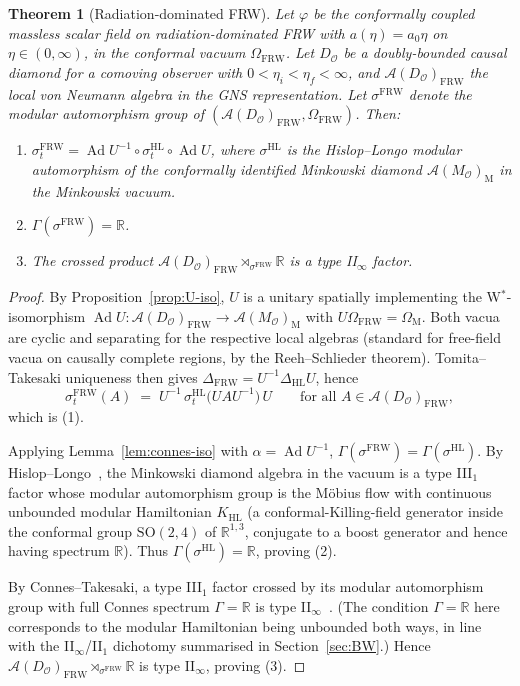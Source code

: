 \documentclass[11pt]{article}
\newtheorem{theorem}{Theorem}
\theoremstyle{definition}
\newcommand{\R}{\mathbb{R}}
\renewcommand{\AA}{\mathcal{A}}
\newcommand{\OO}{\mathcal{O}}
\newcommand{\Ad}{\operatorname{Ad}}
\newcommand{\HL}{\mathrm{HL}}
\newcommand{\FRW}{\mathrm{FRW}}
\newcommand{\Mink}{\mathrm{M}}
\begin{document}
\begin{theorem}[Radiation-dominated FRW]\label{thm:main}
Let $\varphi$ be the conformally coupled massless scalar field on radiation-dominated FRW with $a(\eta)=a_0\eta$ on $\eta\in(0,\infty)$, in the conformal vacuum $\Omega_\FRW$. Let $D_\OO$ be a doubly-bounded causal diamond for a comoving observer with $0<\eta_i<\eta_f<\infty$, and $\AA(D_\OO)_\FRW$ the local von Neumann algebra in the GNS representation. Let $\sigma^\FRW$ denote the modular automorphism group of $(\AA(D_\OO)_\FRW,\Omega_\FRW)$. Then:
\begin{enumerate}
\item $\sigma_t^\FRW = \Ad U^{-1} \circ \sigma_t^\HL \circ \Ad U$, where $\sigma^\HL$ is the Hislop--Longo modular automorphism of the conformally identified Minkowski diamond $\AA(M_\OO)_\Mink$ in the Minkowski vacuum.
\item $\Gamma(\sigma^\FRW) = \R$.
\item The crossed product $\AA(D_\OO)_\FRW \rtimes_{\sigma^\FRW} \R$ is a type II$_\infty$ factor.
\end{enumerate}
\end{theorem}

\begin{proof}
By Proposition~\ref{prop:U-iso}, $U$ is a unitary spatially implementing the W$^*$-isomorphism $\Ad U : \AA(D_\OO)_\FRW \to \AA(M_\OO)_\Mink$ with $U\Omega_\FRW=\Omega_\Mink$. Both vacua are cyclic and separating for the respective local algebras (standard for free-field vacua on causally complete regions, by the Reeh--Schlieder theorem). Tomita--Takesaki uniqueness then gives $\Delta_\FRW = U^{-1}\Delta_\HL U$, hence
\[
\sigma_t^\FRW(A) \;=\; U^{-1}\,\sigma_t^\HL\big(U A U^{-1}\big)\,U \qquad \text{for all }A\in\AA(D_\OO)_\FRW,
\]
which is (1).

Applying Lemma~\ref{lem:connes-iso} with $\alpha = \Ad U^{-1}$, $\Gamma(\sigma^\FRW) = \Gamma(\sigma^\HL)$. By Hislop--Longo~\cite{HislopLongo1982}, the Minkowski diamond algebra in the vacuum is a type III$_1$ factor whose modular automorphism group is the M\"obius flow with continuous unbounded modular Hamiltonian $K_\HL$ (a conformal-Killing-field generator inside the conformal group $\mathrm{SO}(2,4)$ of $\R^{1,3}$, conjugate to a boost generator and hence having spectrum $\R$). Thus $\Gamma(\sigma^\HL)=\R$, proving (2).

By Connes--Takesaki, a type III$_1$ factor crossed by its modular automorphism group with full Connes spectrum $\Gamma=\R$ is type II$_\infty$~\cite[\S2]{CLPW2023, Witten2022}. (The condition $\Gamma=\R$ here corresponds to the modular Hamiltonian being unbounded both ways, in line with the II$_\infty$/II$_1$ dichotomy summarised in Section~\ref{sec:BW}.) Hence $\AA(D_\OO)_\FRW \rtimes_{\sigma^\FRW}\R$ is type II$_\infty$, proving (3).
\end{proof}
\end{document}
